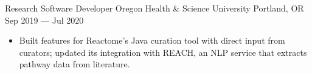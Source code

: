 \showoff
{Research Software Developer}
{Oregon Health \& Science University}
{Portland, OR}
{Sep 2019 --- Jul 2020}

\begin{itemize}
    \item Built features for Reactome's Java curation tool with direct input from curators; updated its integration with REACH, an NLP service that extracts pathway data from literature.
\end{itemize}
